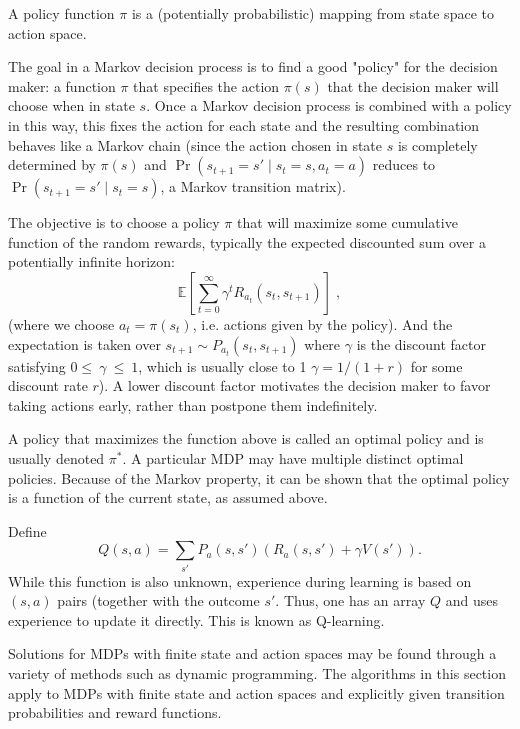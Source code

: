 A policy function 
$\pi$  is a (potentially probabilistic) mapping from state space to action space.

The goal in a Markov decision process is to find a good "policy" for the decision maker: a function 
$\pi$  that specifies the action 
$\pi(s)$ that the decision maker will choose when in state 
$s$. Once a Markov decision process is combined with a policy in this way, this fixes the action for each state and the resulting combination behaves like a Markov chain (since the action chosen in state 
$s$ is completely determined by 
$\pi(s)$ and 
${\displaystyle \Pr(s_{t+1}=s'\mid s_{t}=s,a_{t}=a)}$ reduces to 
${\displaystyle \Pr(s_{t+1}=s'\mid s_{t}=s)}$, a Markov transition matrix).

The objective is to choose a policy 
$\pi$  that will maximize some cumulative function of the random rewards, typically the expected discounted sum over a potentially infinite horizon:
\begin{equation}
{\mathbb{E}\left[\sum _{t=0}^{\infty }{\gamma ^{t}R_{a_{t}}(s_{t},s_{t+1})}\right]} \; ,
\end{equation}
(where we choose 
$a_t = \pi(s_t)$, i.e. actions given by the policy). And the expectation is taken over 
${\displaystyle s_{t+1}\sim P_{a_{t}}(s_{t},s_{t+1})}$
where 
$\gamma$ is the discount factor satisfying 
${\displaystyle 0\leq \ \gamma \ \leq \ 1}$, which is usually close to 1 $\gamma = 1/(1+r)$  for some discount rate $r$). A lower discount factor motivates the decision maker to favor taking actions early, rather than postpone them indefinitely.

A policy that maximizes the function above is called an optimal policy and is usually denoted 
$\pi^*$. A particular MDP may have multiple distinct optimal policies. Because of the Markov property, it can be shown that the optimal policy is a function of the current state, as assumed above.


\bigskip


Define
\begin{equation}
\ Q(s,a) = \sum_{s'} P_a(s,s') (R_a(s,s') + \gamma V(s')).\ 
\end{equation}
While this function is also unknown, experience during learning is based on 
$(s, a)$ pairs (together with the outcome 
$s'$. Thus, one has an array 
$Q$ and uses experience to update it directly. This is known as Q-learning.

Solutions for MDPs with finite state and action spaces may be found through a variety of methods such as dynamic programming. The algorithms in this section apply to MDPs with finite state and action spaces and explicitly given transition probabilities and reward functions.


